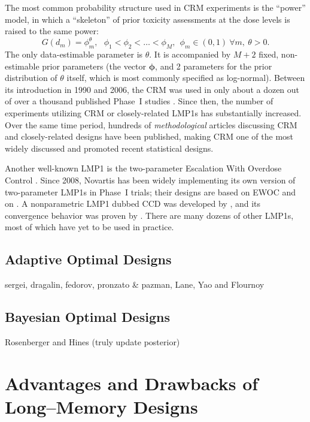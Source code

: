 The most common probability structure used in CRM experiments is the ``power'' model, in which a ``skeleton'' of prior toxicity assessments at the dose levels is raised to the same power:
\begin{equation}\label{eq:crm0}
G\left(d_m\right)=\phi_m^\theta,\ \ \ \phi_1<\phi_2<\ldots <\phi_M ,\ \ \phi_m\in(0,1) \ \forall m,\ \theta>0.
\end{equation}
The only data-estimable parameter is $\theta$. It is accompanied by $M+2$ fixed, non-estimable prior parameters (the vector $\boldsymbol{\phi}$, and 2 parameters for the prior distribution of $\theta$ itself, which is most commonly specified as log-normal). Between its introduction in 1990 and 2006, the CRM was used in only about a dozen out of over a thousand published Phase~I studies \citep{Rogat:etal:oped:2007}. Since then, the number of experiments utilizing CRM or closely-related LMP1s has substantially increased. Over the same time period, hundreds of \emph{methodological} articles discussing CRM and closely-related designs have been published, making CRM one of the most widely discussed and promoted recent statistical designs.

Another well-known LMP1 is the two-parameter Escalation With Overdose Control \citep[EWOC,][]{Babb:Roga:Roga:Zack:canc:1998}. Since 2008, Novartis has been widely implementing its own version of two-parameter LMP1s in Phase~I trials; their designs are based on EWOC and on \cite{Neunsch08}. A nonparametric LMP1 dubbed CCD was developed by \cite{Ivan:Flou:Chun:Cumu:2007}, and its convergence behavior was proven by \cite{oron:azri:hoff:dose:2011}. There are many dozens of other LMP1s, most of which have yet to be used in practice.

\subsection{Adaptive Optimal Designs}
sergei, dragalin, fedorov, pronzato \& pazman, Lane, Yao and Flournoy

\subsection{Bayesian Optimal Designs}
Rosenberger and Hines (truly update posterior)

\section{Advantages and Drawbacks of Long--Memory Designs}

